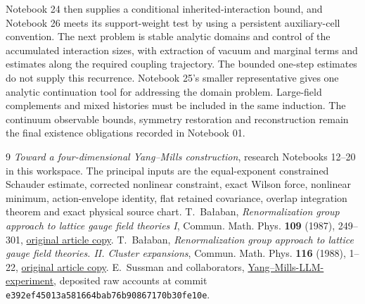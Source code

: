 \documentclass[11pt]{article}
\theoremstyle{remark}
\begin{document}
Notebook 24 then supplies a conditional inherited-interaction
bound, and Notebook 26 meets its support-weight test by using
a persistent auxiliary-cell convention. The next problem is
stable analytic domains and control of the accumulated
interaction sizes, with extraction of vacuum and marginal
terms and estimates along the required coupling trajectory.
The bounded one-step estimates do not supply this recurrence.
Notebook 25's smaller representative gives one analytic
continuation tool for addressing the domain problem.
Large-field complements and mixed histories must be included
in the same induction. The continuum observable bounds,
symmetry restoration and reconstruction remain the final
existence obligations recorded in Notebook 01.

\begin{thebibliography}{9}
\emph{Toward a four-dimensional Yang--Mills construction},
research Notebooks 12--20 in this workspace.
The principal inputs are the equal-exponent constrained
Schauder estimate, corrected nonlinear constraint, exact
Wilson force, nonlinear minimum, action-envelope identity,
flat retained covariance, overlap integration theorem and
exact physical source chart.
T.~Ba\l aban,
\emph{Renormalization group approach to lattice gauge field
theories I}, Commun. Math. Phys. \textbf{109} (1987), 249--301,
\href{https://scispace.com/pdf/renormalization-group-approach-to-lattice-gauge-field-3ygai0vxt1.pdf}{original article copy}.
T.~Ba\l aban,
\emph{Renormalization group approach to lattice gauge field
theories. II. Cluster expansions},
Commun. Math. Phys. \textbf{116} (1988), 1--22,
\href{https://scispace.com/pdf/renormalization-group-approach-to-lattice-gauge-field-4penm4k7hc.pdf}{original article copy}.
E.~Sussman and collaborators,
\href{https://github.com/ethanwsussman/Yang--Mills-LLM-experiment}{Yang--Mills-LLM-experiment},
deposited raw accounts at commit
\texttt{e392ef45013a581664bab76b90867170b30fe10e}.
\end{thebibliography}
\end{document}
